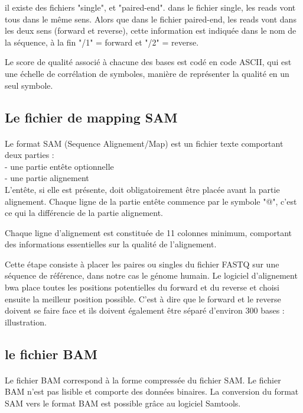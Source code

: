 \documentclass[a4paper,12pt]{article}
\begin{document}
il existe des fichiers "single", et "paired-end". dans le fichier single, les reads vont tous dans le même sens. Alors que dans le fichier paired-end, les reads vont dans les deux sens (forward et reverse), cette information est indiquée dans le nom de la séquence, à la fin "/1" = forward et "/2" = reverse.

Le score de qualité associé à chacune des bases est codé en code ASCII, qui est une échelle de corrélation de symboles, manière de représenter la qualité en un seul symbole.
\\

\subsection{Le fichier de mapping SAM}
\paragraph{}
Le format SAM (Sequence Alignement/Map) est un fichier texte comportant deux parties : \\
- une partie entête optionnelle \\
- une partie alignement\\
L'entête, si elle est présente, doit obligatoirement être placée avant la partie alignement. Chaque ligne de la partie entête commence par le symbole "@", c'est ce qui la différencie de la partie alignement. 

Chaque ligne d'alignement est constituée de 11 colonnes minimum, comportant des informations essentielles sur la qualité de l'alignement.   






Cette étape consiste à placer les paires ou singles du fichier FASTQ sur une séquence de référence, dans notre cas le génome humain. Le logiciel d'alignement bwa place toutes les positions potentielles du forward et du reverse et choisi ensuite la meilleur position possible. C'est à dire que le forward et le reverse doivent se faire face et ils doivent également être séparé d'environ 300 bases  : illustration. 
\subsection{le fichier BAM}
\paragraph{}
Le fichier BAM correspond à la forme compressée du fichier SAM. Le fichier BAM n'est pas lisible et comporte des données binaires. La conversion du format SAM vers le format BAM est possible grâce au logiciel Samtools. 
 \\
\end{document}
